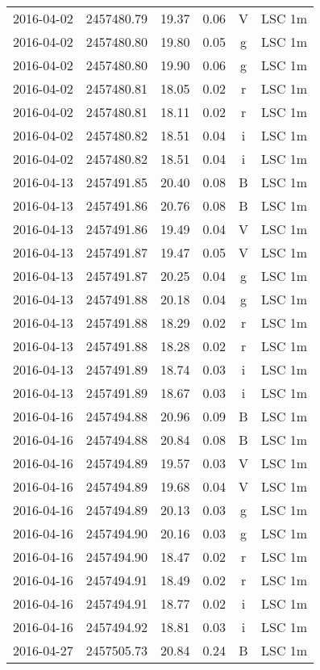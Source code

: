 \begin{table}
\begin{tabular}{cccccc}
2016-04-02 & 2457480.79 & 19.37 & 0.06 & V & LSC 1m \\
2016-04-02 & 2457480.80 & 19.80 & 0.05 & g & LSC 1m \\
2016-04-02 & 2457480.80 & 19.90 & 0.06 & g & LSC 1m \\
2016-04-02 & 2457480.81 & 18.05 & 0.02 & r & LSC 1m \\
2016-04-02 & 2457480.81 & 18.11 & 0.02 & r & LSC 1m \\
2016-04-02 & 2457480.82 & 18.51 & 0.04 & i & LSC 1m \\
2016-04-02 & 2457480.82 & 18.51 & 0.04 & i & LSC 1m \\
2016-04-13 & 2457491.85 & 20.40 & 0.08 & B & LSC 1m \\
2016-04-13 & 2457491.86 & 20.76 & 0.08 & B & LSC 1m \\
2016-04-13 & 2457491.86 & 19.49 & 0.04 & V & LSC 1m \\
2016-04-13 & 2457491.87 & 19.47 & 0.05 & V & LSC 1m \\
2016-04-13 & 2457491.87 & 20.25 & 0.04 & g & LSC 1m \\
2016-04-13 & 2457491.88 & 20.18 & 0.04 & g & LSC 1m \\
2016-04-13 & 2457491.88 & 18.29 & 0.02 & r & LSC 1m \\
2016-04-13 & 2457491.88 & 18.28 & 0.02 & r & LSC 1m \\
2016-04-13 & 2457491.89 & 18.74 & 0.03 & i & LSC 1m \\
2016-04-13 & 2457491.89 & 18.67 & 0.03 & i & LSC 1m \\
2016-04-16 & 2457494.88 & 20.96 & 0.09 & B & LSC 1m \\
2016-04-16 & 2457494.88 & 20.84 & 0.08 & B & LSC 1m \\
2016-04-16 & 2457494.89 & 19.57 & 0.03 & V & LSC 1m \\
2016-04-16 & 2457494.89 & 19.68 & 0.04 & V & LSC 1m \\
2016-04-16 & 2457494.89 & 20.13 & 0.03 & g & LSC 1m \\
2016-04-16 & 2457494.90 & 20.16 & 0.03 & g & LSC 1m \\
2016-04-16 & 2457494.90 & 18.47 & 0.02 & r & LSC 1m \\
2016-04-16 & 2457494.91 & 18.49 & 0.02 & r & LSC 1m \\
2016-04-16 & 2457494.91 & 18.77 & 0.02 & i & LSC 1m \\
2016-04-16 & 2457494.92 & 18.81 & 0.03 & i & LSC 1m \\
2016-04-27 & 2457505.73 & 20.84 & 0.24 & B & LSC 1m \\

\end{tabular}
\end{table}
